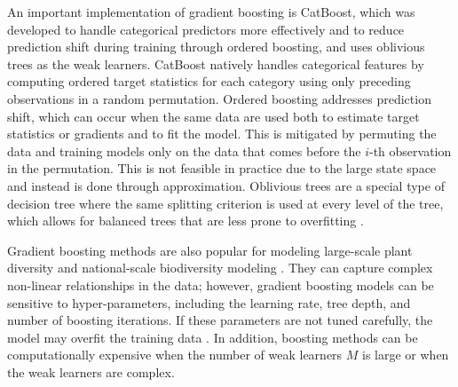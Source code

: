 An important implementation of gradient boosting is CatBoost, which was developed to handle categorical predictors more effectively and to reduce prediction shift during training through ordered boosting, and uses oblivious trees as the weak learners. CatBoost natively handles categorical features by computing ordered target statistics for each category using only preceding observations in a random permutation. Ordered boosting addresses prediction shift, which can occur when the same data are used both to estimate target statistics or gradients and to fit the model. This is mitigated by permuting the data and training models only on the data that comes before the \(i\)-th observation in the permutation. This is not feasible in practice due to the large state space and instead is done through approximation. Oblivious trees are a special type of decision tree where the same splitting criterion is used at every level of the tree, which allows for balanced trees that are less prone to overfitting \parencite{Prokhorenkova2018}. 

Gradient boosting methods are also popular for modeling large-scale plant diversity and national-scale biodiversity modeling \parencite{cai2023, baggstrom2025}. They can capture complex non-linear relationships in the data; however, gradient boosting models can be sensitive to hyper-parameters, including the learning rate, tree depth, and number of boosting iterations. If these parameters are not tuned carefully, the model may overfit the training data \parencite{friedman2001}. In addition, boosting methods can be computationally expensive when the number of weak learners \(M\) is large or when the weak learners are complex.

